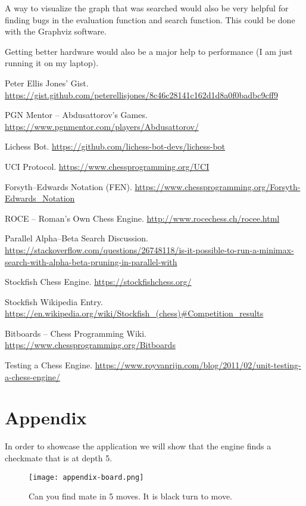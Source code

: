 \documentclass[sigconf]{acmart}
\begin{document}
A way to visualize the graph that was searched would also be very helpful for finding bugs in the evaluation function and search function.
This could be done with the Graphviz software.

Getting better hardware would also be a major help to performance (I am just running it on my laptop).

\begin{thebibliography}{99}

Peter Ellis Jones' Gist.
\url{https://gist.github.com/peterellisjones/8c46c28141c162d1d8a0f0badbc9cff9}

PGN Mentor – Abdusattorov's Games.
\url{https://www.pgnmentor.com/players/Abdusattorov/}

Lichess Bot.
\url{https://github.com/lichess-bot-devs/lichess-bot}

UCI Protocol.
\url{https://www.chessprogramming.org/UCI}

Forsyth–Edwards Notation (FEN).
\url{https://www.chessprogramming.org/Forsyth-Edwards_Notation}

ROCE – Roman's Own Chess Engine.
\url{http://www.rocechess.ch/rocee.html}

Parallel Alpha–Beta Search Discussion.
\url{https://stackoverflow.com/questions/26748118/is-it-possible-to-run-a-minimax-search-with-alpha-beta-pruning-in-parallel-with}

Stockfish Chess Engine.
\url{https://stockfishchess.org/}

Stockfish Wikipedia Entry.
\url{https://en.wikipedia.org/wiki/Stockfish_(chess)#Competition_results}

Bitboards – Chess Programming Wiki.
\url{https://www.chessprogramming.org/Bitboards}

Testing a Chess Engine.
\url{https://www.royvanrijn.com/blog/2011/02/unit-testing-a-chess-engine/}

\end{thebibliography}

\section{Appendix}
In order to showcase the application we will show that the engine finds a checkmate that is at depth 5.
\begin{figure}[H]
    \centering
    \texttt{[image: appendix-board.png]}
    \caption{Can you find mate in 5 moves. It is black turn to move.}
    \label{fig:enter-label}
\end{figure}
\end{document}
